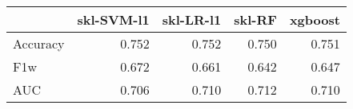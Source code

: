 \begin{tabular}{lrrrr}
\toprule
{} &  skl-SVM-l1 &  skl-LR-l1 &  skl-RF &  xgboost \\
\midrule
Accuracy &       0.752 &      0.752 &   0.750 &    0.751 \\
F1w      &       0.672 &      0.661 &   0.642 &    0.647 \\
AUC      &       0.706 &      0.710 &   0.712 &    0.710 \\
\bottomrule
\end{tabular}

